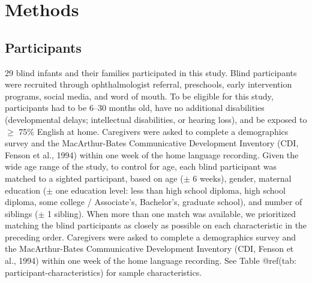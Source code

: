 \documentclass[
  man,floatsintext]{apa6}
\begin{document}
\hypertarget{methods}{%
\section{Methods}\label{methods}}

\hypertarget{participants}{%
\subsection{Participants}\label{participants}}

29 blind infants and their families participated in this study. Blind participants were recruited through ophthalmologist referral, preschools, early intervention programs, social media, and word of mouth. To be eligible for this study, participants had to be 6--30 months old, have no additional disabilities (developmental delays; intellectual disabilities, or hearing loss), and be exposed to \(\geq\) 75\% English at home. Caregivers were asked to complete a demographics survey and the MacArthur-Bates Communicative Development Inventory (CDI, Fenson et al., 1994) within one week of the home language recording. Given the wide age range of the study, to control for age, each blind participant was matched to a sighted participant, based on age (\(\pm\) 6 weeks), gender, maternal education (\(\pm\) one education level: less than high school diploma, high school diploma, some college / Associate's, Bachelor's, graduate school), and number of siblings (\(\pm\) 1 sibling). When more than one match was available, we prioritized matching the blind participants as closely as possible on each characteristic in the preceding order. Caregivers were asked to complete a demographics survey and the MacArthur-Bates Communicative Development Inventory (CDI, Fenson et al., 1994) within one week of the home language recording. See Table @ref(tab: participant-characteristics) for sample characteristics.
\end{document}
